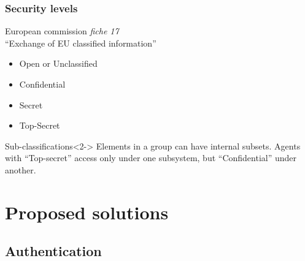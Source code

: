 \documentclass{beamer}
\begin{document}
\begin{frame}
\frametitle{Security levels}
    European commission \emph{fiche 17} \\``Exchange of EU classified information'' \cite{fiche17EU}
    \begin{itemize}
        \item Open or Unclassified
        \item Confidential
        \item Secret
        \item Top-Secret
    \end{itemize}
   \begin{exampleblock}{Sub-classifications}<2->
       Elements in a group can have internal subsets. Agents with ``Top-secret'' access only under one subsystem, but ``Confidential'' under another.
   \end{exampleblock}
\end{frame}

\section{Proposed solutions}


\subsection{Authentication}
\end{document}
